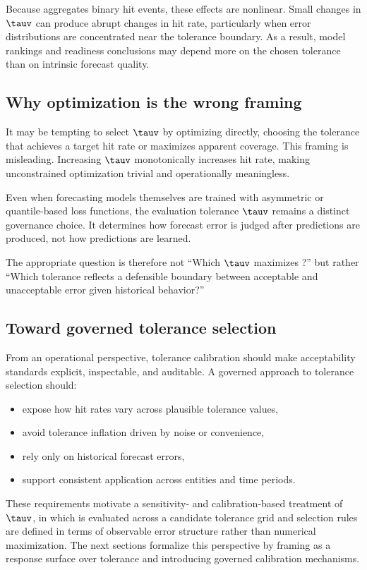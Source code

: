 Because \HRtau{} aggregates binary hit events, these effects are nonlinear.
Small changes in $\tauv$ can produce abrupt changes in hit rate, particularly
when error distributions are concentrated near the tolerance boundary.
As a result, model rankings and readiness conclusions may depend more on the
chosen tolerance than on intrinsic forecast quality.

\subsection{Why optimization is the wrong framing}
\label{subsec:why_not_optimization}

It may be tempting to select $\tauv$ by optimizing \HRtau{} directly, choosing
the tolerance that achieves a target hit rate or maximizes apparent coverage.
This framing is misleading.
Increasing $\tauv$ monotonically increases hit rate, making unconstrained
optimization trivial and operationally meaningless.

Even when forecasting models themselves are trained with asymmetric or
quantile-based loss functions, the evaluation tolerance $\tauv$ remains a
distinct governance choice.
It determines how forecast error is judged after predictions are produced, not
how predictions are learned.

The appropriate question is therefore not
``Which $\tauv$ maximizes \HRtau{}?''
but rather
``Which tolerance reflects a defensible boundary between acceptable and
unacceptable error given historical behavior?''

\subsection{Toward governed tolerance selection}
\label{subsec:governed_tolerance}

From an operational perspective, tolerance calibration should make acceptability
standards explicit, inspectable, and auditable.
A governed approach to tolerance selection should:
\begin{itemize}[leftmargin=*]
    \item expose how hit rates vary across plausible tolerance values,
    \item avoid tolerance inflation driven by noise or convenience,
    \item rely only on historical forecast errors,
    \item support consistent application across entities and time periods.
\end{itemize}

These requirements motivate a sensitivity- and calibration-based treatment of
$\tauv$, in which \HRtau{} is evaluated across a candidate tolerance grid and
selection rules are defined in terms of observable error structure rather than
numerical maximization.
The next sections formalize this perspective by framing \HRtau{} as a response
surface over tolerance and introducing governed calibration mechanisms.
